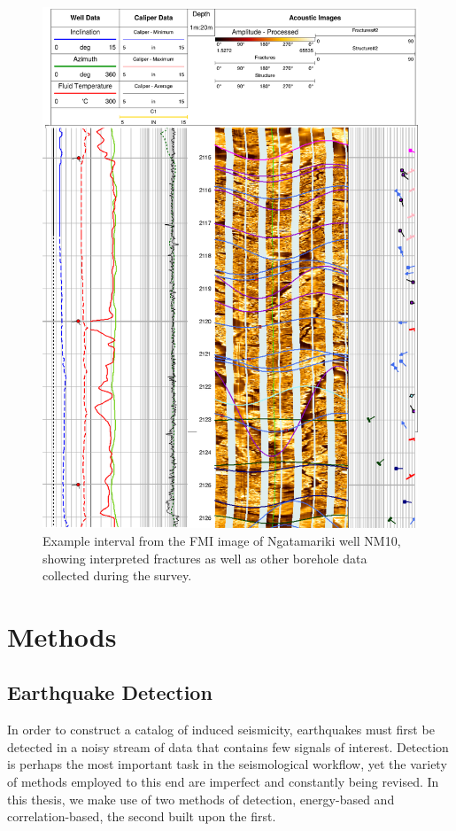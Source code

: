 \begin{figure}[h!]
\begin{center}
\includegraphics[width=0.70\columnwidth]{Chapter_2_Data/figures/FMI_example_mod/FMI_example_mod_original}
\caption{{Example interval from the FMI image of Ngatamariki well NM10, showing
interpreted fractures as well as other borehole data collected during
the survey.
{\label{746257}}%
}}
\end{center}
\end{figure}

\section{Methods}
\subsection{Earthquake Detection}
In order to construct a catalog of induced seismicity, earthquakes must first be detected in a noisy stream of data that contains few signals of interest. Detection is perhaps the most important task in the seismological workflow, yet the variety of methods employed to this end are imperfect and constantly being revised. In this thesis, we make use of two methods of detection, energy-based and correlation-based, the second built upon the first.

